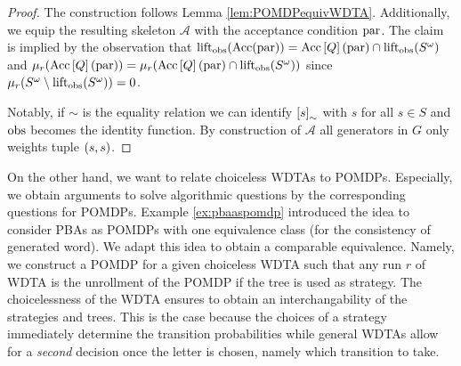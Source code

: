 \begin{proof}
  The construction follows Lemma \ref{lem:POMDPequivWDTA}. Additionally, we
  equip the resulting skeleton $\mathcal{A}$ with the acceptance condition
  $\operatorname{par}$. The claim is implied by the observation that
  $\operatorname{lift}_{\operatorname{obs}}(\operatorname{Acc}(\operatorname{par}))
  = \operatorname{Acc}\left[Q\right](\operatorname{par})\cap\operatorname{lift}_{\operatorname{obs}}(S^{\omega})$ and
  $\mu_{r}(\operatorname{Acc}\left[Q\right](\operatorname{par})) =
  \mu_{r}(\operatorname{Acc}\left[Q\right](\operatorname{par})\cap\operatorname{lift}_{\operatorname{obs}}(S^{\omega}))$ since
  $\mu_{r}(S^{\omega}\setminus\operatorname{lift}_{\operatorname{obs}}(S^{\omega})) = 0$.

  Notably, if $\sim$ is the equality relation we can identify
  $\left[s\right]_{\sim}$ with $s$ for all $s\in S$ and $\operatorname{obs}$ becomes the
  identity function. By construction of $\mathcal{A}$ all generators in $G$
  only weights tuple $\left(s,s\right)$.
\end{proof}

On the other hand, we want to relate choiceless \acp{WDTA} to \acp{POMDP}.
Especially, we obtain arguments to solve algorithmic questions by the
corresponding questions for \acp{POMDP}. Example \ref{ex:pbaaspomdp} introduced
the idea to consider \acp{PBA} as \acp{POMDP} with one equivalence class (for
the consistency of generated word). We adapt this idea to obtain a comparable
equivalence. Namely, we construct a \ac{POMDP} for a given choiceless \ac{WDTA}
such that any run $r$ of \ac{WDTA} is the unrollment of the \ac{POMDP} if the
tree is used as strategy. The choicelessness of the \ac{WDTA} ensures to obtain
an interchangability of the strategies and trees. This is the case because the
choices of a strategy immediately determine the transition probabilities while
general \acp{WDTA} allow for a \emph{second} decision once the letter is
chosen, namely which transition to take.

